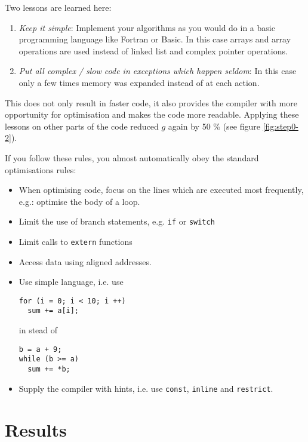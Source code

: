 \documentclass[a4paper]{article}
\begin{document}
Two lessons are learned here:
\begin{enumerate}
\item \emph{Keep it simple}: Implement your algorithms as you would do in a
basic programming language like Fortran or Basic. In this case arrays and
array operations are used instead of linked list  and complex pointer
operations.
\item \emph{Put all complex / slow code in exceptions which happen seldom}: 
In this case only a few times memory was expanded instead of at each action.
\end{enumerate}
This does not only result in faster code, it also provides the compiler with
more opportunity for optimisation and makes the code more readable.
Applying these lessons on other parts of the code reduced $g$ again by 50 \%
(see figure \ref{fig:step0-2}). 

If you follow these rules, you almost automatically obey the standard
optimisations rules:
\begin{itemize}
\item When optimising code, focus on the lines which are executed most
frequently, e.g.: optimise the body of a loop. 
\item Limit the use of branch statements, e.g. \verb|if| or \verb|switch|
\item Limit calls to \verb|extern| functions 
\item Access data using aligned addresses.
\item Use simple language, i.e. use 
\begin{verbatim}
for (i = 0; i < 10; i ++)
  sum += a[i];
\end{verbatim}    
in stead of
\begin{verbatim}
b = a + 9;
while (b >= a) 
  sum += *b;
\end{verbatim}  
\item Supply the compiler with hints, i.e. use \verb|const|, \verb|inline| and
\verb|restrict|.
\end{itemize}   

\section{Results}
\end{document}
